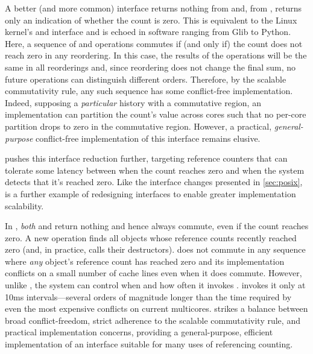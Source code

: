 A better (and more common) interface returns nothing from 
and, from , returns only an indication of whether the count
is zero.  This is equivalent to the Linux kernel's 
and  interface and is echoed in software
ranging from Glib to Python.  Here, a sequence of  and
 operations commutes if (and only if) the count does not
reach zero in any reordering.  In this case, the results of the
operations will be the same in all reorderings and, since reordering
does not change the final sum, no future operations can distinguish
different orders.  Therefore, by the scalable commutativity rule, any
such sequence has some conflict-free implementation.  Indeed,
supposing a \emph{particular} history with a commutative region, an
implementation can partition the count's value across cores such that
no per-core partition drops to zero in the commutative region.
However, a practical, \emph{general-purpose} conflict-free
implementation of this interface remains elusive.

 pushes this interface reduction further, targeting
reference counters that can tolerate some latency between when the
count reaches zero and when the system detects that it's reached zero.
%
Like the interface changes presented in \cref{sec:posix}, 
is a further example of redesigning interfaces to enable greater
implementation scalability.
%

In , \emph{both}  and  return nothing and
hence always commute, even if the count reaches zero.  A new
 operation finds all objects whose reference counts
recently reached zero (and, in practice, calls their destructors).
 does not commute in any sequence where \emph{any}
object's reference count has reached zero and its implementation
conflicts on a small number of cache lines even when it does commute.
%
However, unlike , the system can control when and how often
it invokes .
%
\sys invokes it
only at 10ms intervals---several orders of magnitude longer than the
time required by even the most expensive conflicts on current
multicores.
%
 strikes a balance between broad conflict-freedom, strict
adherence to the scalable commutativity rule, and practical
implementation concerns, providing a general-purpose, efficient
implementation of an interface suitable for many uses of referencing
counting.


